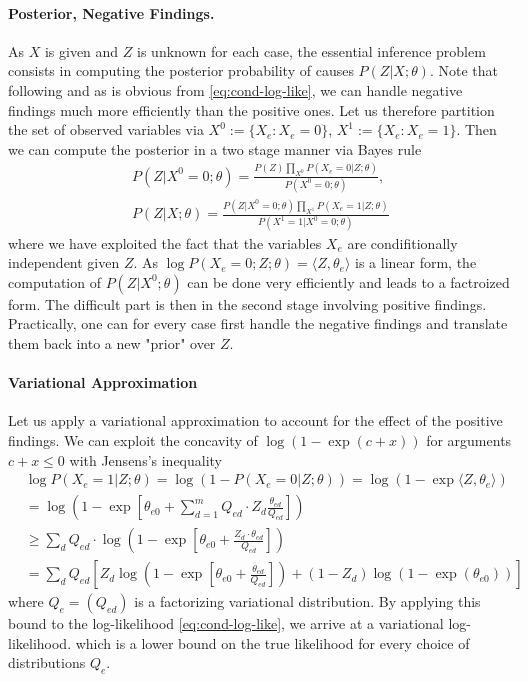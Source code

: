 \documentclass{article}
\begin{document}
\paragraph{Posterior, Negative Findings.} As $X$ is given and $Z$ is unknown for each case, the essential inference problem consists in computing the posterior probability of causes $P(Z|X; \theta)$. Note that following \cite{jaakkola1999variational} and as is obvious from \eqref{eq:cond-log-like}, we can handle negative findings much more efficiently than the positive ones. Let us therefore partition the set of observed variables via  $X^0 := \{ X_e: X_e=0\}$, $X^1 := \{ X_e : X_e=1\}$. Then we can compute the posterior in a two stage manner via Bayes rule
\begin{align}
& P(Z | X^0=0; \theta) = \frac{P(Z) \prod_{X^0}P (X_e=0|Z; \theta)}{P(X^0=0;\theta)}, \quad \\
& P(Z | X; \theta) = \frac{P(Z | X^0=0; \theta) \prod_{X^1} P(X_e=1|Z; \theta)}{P(X^1=1|X^0=0; \theta)}
\end{align}
where we have exploited the fact that the variables $X_e$ are condifitionally independent given $Z$. As $\log P(X_e=0; Z; \theta) = \langle Z, \theta_e \rangle$ is a linear form, the computation of  $P(Z | X^0; \theta)$ can be done very efficiently and leads to a factroized form. The difficult part is then in the second stage involving positive findings. Practically, one can for every case first handle the negative findings and translate them back into a new "prior" over $Z$. 

\paragraph{Variational Approximation} Let us apply a variational approximation to account for the effect of the positive findings. We can exploit the concavity of $\log (1-\exp(c+ x))$ for arguments $c + x \le 0 $ with Jensens's inequality
\begin{align}
& \log P(X_e=1| Z; \theta) = \log (1- P(X_e=0|Z; \theta)) = \log \left( 1 - \exp \langle Z, \theta_e \rangle \right) \\
& = \log \left( 1 - \exp \left[ \theta_{e0} + \sum_{d=1}^m Q_{ed} \cdot Z_d \frac{\theta_{ed}}{Q_{ed}} \right] \right) \\
& \ge  \sum_d Q_{ed} \cdot \log \left( 1 - \exp \left[ \theta_{e0} + \frac{Z_d \cdot \theta_{ed}}{Q_{ed}} \right] \right) \\
& =  \sum_d  Q_{ed} 
\left[ Z_{d} \log \left( 1 - \exp \left[ \theta_{e0} + \frac{\theta_{ed}}{Q_{ed}} \right] \right) 
+ (1-Z_d) \log(1-\exp(\theta_{e0}))
\right]
\end{align}
where $Q_e= (Q_{ed})$ is a factorizing variational distribution.  By applying this bound to the log-likelihood \eqref{eq:cond-log-like}, we arrive at a variational log-likelihood. which is a lower bound on the true likelihood for every choice of distributions $Q_e$.
\end{document}
